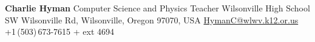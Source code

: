 \documentclass[letterpaper,MMMyyyy,nonstop]{simpleresumecv}
\newcommand{\CVNote}{}
\begin{document}
\begin{body}
\BigGap
\BulletItem
\textbf{Charlie Hyman}
\newline
Computer Science and Physics Teacher 
\newline
Wilsonville High School
 SW Wilsonville Rd, 
Wilsonville, Oregon 97070, USA
\newline
\href{mailto:HymanC@wlwv.k12.or.us}
{HymanC@wlwv.k12.or.us}
\,\SubBulletSymbol\,
+1\,(503)\,673-7615 + ext 4694

\fi
\end{body}

\iffalse

\UseNoteFont%
\null\hfill%
[\textit{\CVNote}]%
\hspace{2.0mm}\null

\fi
\end{document}
